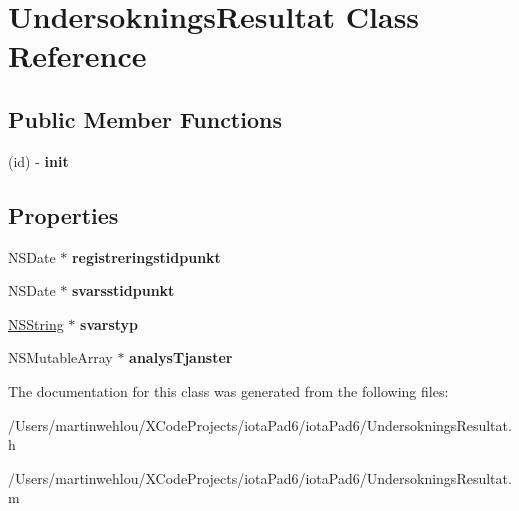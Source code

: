 \hypertarget{interface_undersoknings_resultat}{
\section{UndersokningsResultat Class Reference}
\label{interface_undersoknings_resultat}
}
\subsection*{Public Member Functions}
\begin{DoxyCompactItemize}
\item 
\hypertarget{interface_undersoknings_resultat_a230ffad141737a87a5c96d292f501e66}{
(id) -\/ {\bfseries init}}
\label{interface_undersoknings_resultat_a230ffad141737a87a5c96d292f501e66}

\end{DoxyCompactItemize}
\subsection*{Properties}
\begin{DoxyCompactItemize}
\item 
\hypertarget{interface_undersoknings_resultat_a02a5b908e6d8e597f8863bd95827bd22}{
NSDate $\ast$ {\bfseries registreringstidpunkt}}
\label{interface_undersoknings_resultat_a02a5b908e6d8e597f8863bd95827bd22}

\item 
\hypertarget{interface_undersoknings_resultat_acb40ab17da069b07e893aca2d2b00044}{
NSDate $\ast$ {\bfseries svarsstidpunkt}}
\label{interface_undersoknings_resultat_acb40ab17da069b07e893aca2d2b00044}

\item 
\hypertarget{interface_undersoknings_resultat_a290392e59d89c1fc08c542a135876ee4}{
\hyperlink{class_n_s_string}{NSString} $\ast$ {\bfseries svarstyp}}
\label{interface_undersoknings_resultat_a290392e59d89c1fc08c542a135876ee4}

\item 
\hypertarget{interface_undersoknings_resultat_ac270444b4462e67b070a6c1033491bb1}{
NSMutableArray $\ast$ {\bfseries analysTjanster}}
\label{interface_undersoknings_resultat_ac270444b4462e67b070a6c1033491bb1}

\end{DoxyCompactItemize}


The documentation for this class was generated from the following files:\begin{DoxyCompactItemize}
\item 
/Users/martinwehlou/XCodeProjects/iotaPad6/iotaPad6/UndersokningsResultat.h\item 
/Users/martinwehlou/XCodeProjects/iotaPad6/iotaPad6/UndersokningsResultat.m\end{DoxyCompactItemize}
